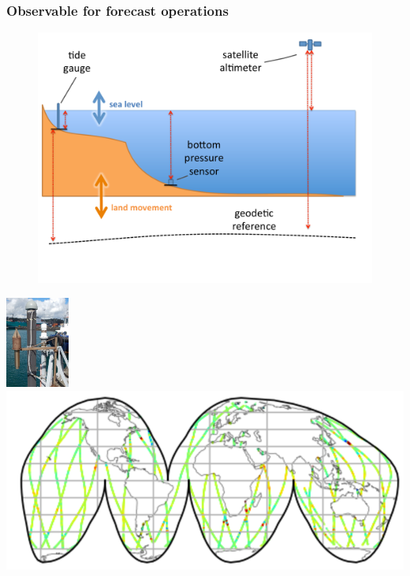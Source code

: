 \begin{frame}
\frametitle{Observable for forecast operations}
\begin{minipage}{0.6\textwidth}
    \begin{figure}      
    \includegraphics[width=\textwidth]{figures/diagrams/sealevel_cartoon.pdf}
    \end{figure}
\end{minipage}
\begin{minipage}{0.35\textwidth}
    \includegraphics[height=3cm]{figures/images/tidegaugeEg.png}
    \vspace{1cm}
    \includegraphics[width=\textwidth]{figures/maps/altimeterCoverageEg.png}
\end{minipage}

\end{frame}
